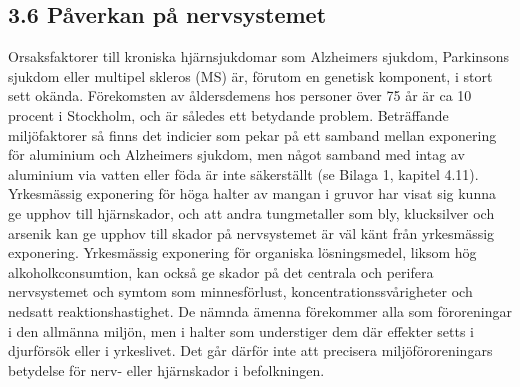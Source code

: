 \subsection*{3.6 Påverkan på nervsystemet}
Orsaksfaktorer till kroniska hjärnsjukdomar som Alzheimers sjukdom, Parkinsons sjukdom eller multipel skleros (MS) är, förutom en genetisk komponent, i stort sett okända. Förekomsten av åldersdemens hos personer över 75 år är ca 10 procent i Stockholm, och är således ett betydande problem.
Beträffande miljöfaktorer så finns det indicier som pekar på ett samband mellan exponering för aluminium och Alzheimers sjukdom, men något samband med intag av aluminium via vatten eller föda är inte säkerställt (se Bilaga 1, kapitel 4.11).
Yrkesmässig exponering för höga halter av mangan i gruvor har visat sig kunna ge upphov till hjärnskador, och att andra tungmetaller som bly, klucksilver och arsenik kan ge upphov till skador på nervsystemet är väl känt från yrkesmässig exponering. Yrkesmässig exponering för organiska lösningsmedel, liksom hög alkoholkconsumtion, kan också ge skador på det centrala och perifera nervsystemet och symtom som minnesförlust, koncentrationssvårigheter och nedsatt reaktionshastighet.
De nämnda ämenna förekommer alla som föroreningar i den allmänna miljön, men i halter som understiger dem där effekter setts i djurförsök eller i yrkeslivet. Det går därför inte att precisera miljöföroreningars betydelse för nerv- eller hjärnskador i befolkningen.

